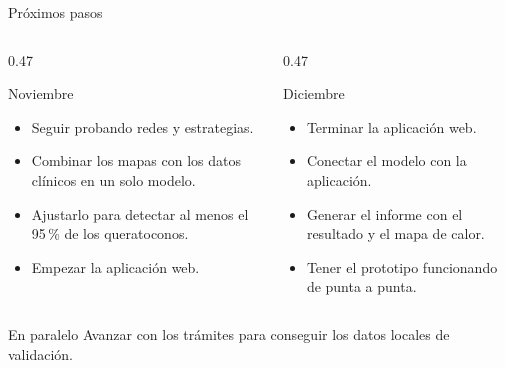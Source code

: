 \begin{frame}{Próximos pasos}
    \vspace{-0.5cm}
    \begin{columns}[T, totalwidth=0.99\textwidth]
        \begin{column}{0.47\textwidth}
            \begin{block}{Noviembre}
                \begin{itemize}
                    \item Seguir probando redes y estrategias.
                    \item Combinar los mapas con los datos clínicos en un solo modelo.
                    \item Ajustarlo para detectar al menos el 95\,\% de los queratoconos.
                    \item Empezar la aplicación web.
                \end{itemize}
            \end{block}
        \end{column}
        \hspace{0.03\textwidth}
        \begin{column}{0.47\textwidth}
            \begin{block}{Diciembre}
                \begin{itemize}
                    \item Terminar la aplicación web.
                    \item Conectar el modelo con la aplicación.
                    \item Generar el informe con el resultado y el mapa de calor.
                    \item Tener el prototipo funcionando de punta a punta.
                \end{itemize}
            \end{block}
        \end{column}
    \end{columns}
    \vspace{0.3cm}
    \noindent\begin{minipage}{0.99\textwidth}
        \begin{block}{En paralelo}
            Avanzar con los trámites para conseguir los datos locales de validación.
        \end{block}
    \end{minipage}
\end{frame}
